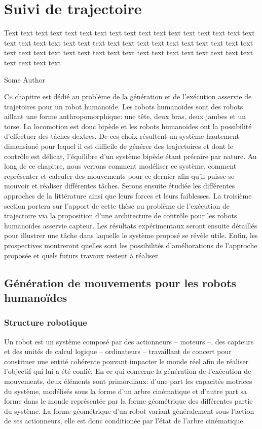 \chapter{Suivi de trajectoire}
\label{chap:suivi}

\epigraph{Text text text text text text text text text text text text
  text text text text text text text text text text text text text
  text text text text text text text text text text text text text
  text text text text text text text text text text text text text
  text text text text}{Some Author}
\clearpage

\lettrine[lines=2, lraise=0.1, nindent=0em, slope=-.5em]%
{C}{e} chapitre est dédié au problème de la génération et de
l'exécution asservie de trajetoires pour un robot humanoïde. Les
robots humanoïdes sont des robots aillant une forme anthropomorphique:
une tête, deux bras, deux jambes et un torse. La locomotion est donc
bipède et les robots humanoïdes ont la possibilité d'effectuer des
tâches dextres. De ces choix résultent un système hautement dimensioné
pour lequel il est difficile de générer des trajectoires et dont le
contrôle est délicat, l'équilibre d'un système bipède étant précaire
par nature. Au long de ce chapitre, nous verrons comment modéliser ce
système, comment représenter et calculer des mouvements pour ce
dernier afin qu'il puisse se mouvoir et réaliser différentes
tâches. Serons ensuite étudiée les différentes approches de la
littérature ainsi que leurs forces et leurs faiblesses. La troisième
section portera sur l'apport de cette thèse au problème de l'exécution
de trajectoire via la proposition d'une architecture de contrôle pour
les robots humanoïdes asservie capteur. Les résultats expérimentaux
seront ensuite détaillés pour illustrer une tâche dans laquelle le
système proposé se révèle utile. Enfin, les prospectives montreront
quelles sont les possibilités d'améliorations de l'approche proposée
et quels futurs travaux restent à réaliser.

\section{Génération de mouvements pour les robots humanoïdes}
\subsection{Structure robotique}

Un robot est un système composé par des actionneurs -- moteurs --, des
capteurs et des unités de calcul logique -- ordinateurs -- travaillant
de concert pour constituer une entité cohérente pouvant impacter le
monde réel afin de réaliser l'objectif qui lui a été confié. En ce qui
concerne la génération de l'exécution de mouvements, deux éléments
sont primordiaux: d'une part les capacités motrices du système,
modélisés sous la forme d'un arbre cinématique et d'autre part sa
forme dans le monde représentée par la forme géométrique des
différentes partie du système. La forme géométrique d'un robot variant
généralement sous l'action de ses actionneurs, elle est donc
conditionée par l'état de l'arbre cinématique.

